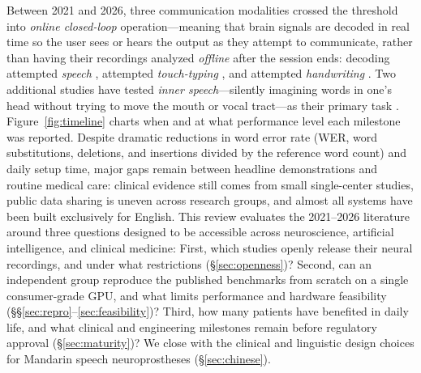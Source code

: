 \documentclass[11pt]{article}
\begin{document}
Between 2021 and 2026, three communication modalities crossed the threshold
into \emph{online closed-loop} operation---meaning that brain signals
are decoded in real time so the user sees or hears the output as they
attempt to communicate, rather than having their recordings analyzed
\emph{offline} after the session ends: decoding attempted \emph{speech}
\cite{card2024, moses2021, metzger2023, willett2023, angrick2024, wairagkar2025, jude2026lis},
attempted \emph{touch-typing} \cite{jude2026typing}, and attempted
\emph{handwriting} \cite{willett2021, fan2023}. Two additional studies have
tested \emph{inner speech}---silently imagining words in one's head
without trying to move the mouth or vocal tract---as their primary task
\cite{wandelt2024, kunz2025}. Figure~\ref{fig:timeline} charts when and
at what performance level each milestone was reported. Despite dramatic
reductions in word error rate (WER, word substitutions, deletions, and
insertions divided by the reference word count) and daily setup time, major gaps remain between headline
demonstrations and routine medical care: clinical evidence still comes
from small single-center studies, public data sharing is uneven across
research groups, and almost all systems have been built exclusively for
English. This review evaluates the 2021--2026 literature around three
questions designed to be accessible across neuroscience, artificial
intelligence, and clinical medicine: First, which studies openly release
their neural recordings, and under what restrictions
(\S\ref{sec:openness})? Second, can an independent group reproduce the
published benchmarks from scratch on a single consumer-grade GPU, and
what limits performance and hardware feasibility
(\S\S\ref{sec:repro}--\ref{sec:feasibility})? Third, how many patients have benefited
in daily life, and what clinical and engineering milestones remain
before regulatory approval (\S\ref{sec:maturity})? We close with
the clinical and linguistic design choices for Mandarin speech
neuroprostheses (\S\ref{sec:chinese}).
\end{document}
